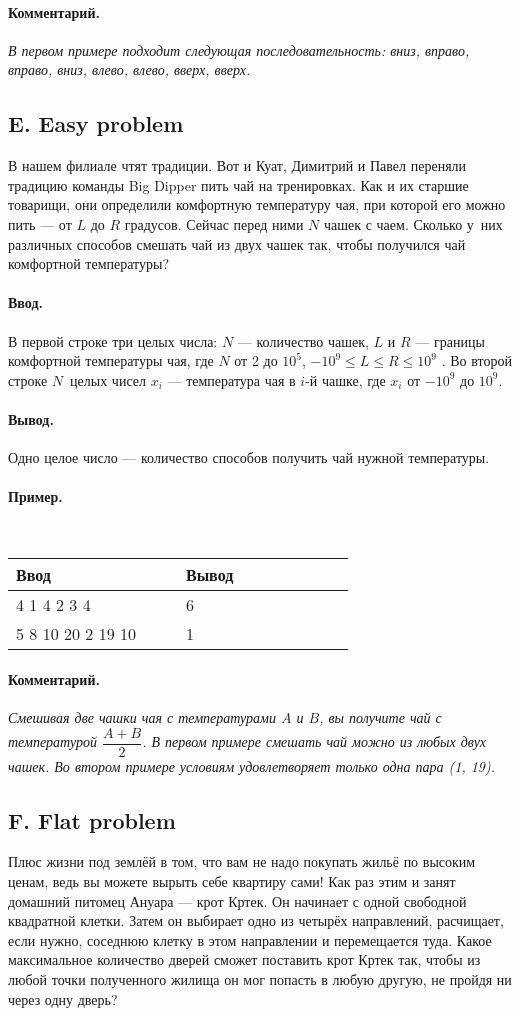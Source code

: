 \documentclass[12pt, a4paper]{article}
\newcommand{\informat}[1]
{
	\paragraph{Ввод.\\} #1
}
\newcommand{\outformat}[1]
{
	\paragraph{Вывод.\\} #1
}
\newcommand{\examplee}[4]
{
	\paragraph{Пример.\\}
	{\tt
	\begin{tabular}{|p{0.4\linewidth}|p{0.4\linewidth}|}
	\hline
	Ввод 	& Вывод  	\\
	\hline
	#1 		& #2 		\\
	\hline
	#3		& #4		\\
	\hline
	\end{tabular}
	}
}
\newcommand{\excomm}[1]
{
	\paragraph{Комментарий. \\}
	\textit{#1}
}
\begin{document}
\excomm{В первом примере подходит следующая последовательность: вниз, впра\-во, впра\-во, вниз, влево, влево, вверх, вверх.}





\subsection*{E. Easy problem}


В нашем филиале чтят традиции. Вот и Куат, Димитрий и Павел переняли традицию команды Big Dipper пить чай на тренировках. Как и их старшие товарищи, они определили комфортную температуру чая, при которой его мож\-но пить --- от $L$ до $R$ градусов. Сейчас перед ними $N$ чашек с чаем. Сколько у~них различных способов смешать чай из двух чашек так, чтобы получился чай комфортной температуры?

\informat{В первой строке три целых числа: $N$ --- количество чашек, $L$ и $R$ --- границы комфортной температуры чая, где $N$ от 2 до $10^5$, $-10^9 \leqslant L \leqslant R \leqslant 10^9$ . \newline
Во второй строке $N$~целых чисел $x_i$ --- температура чая в $i$-й чашке, где $x_i$ от $-10^9$ до $10^9$.}

\outformat{Одно целое число --- количество способов получить чай нужной температуры.}
 
\examplee{
4 1 4 \newline 
1 2 3 4}
{6}
{
5 8 10 \newline
1 20 2 19 10}
{1}

\excomm{Смешивая две чашки чая с температурами $A$ и $B$, вы получите чай с тем\-пе\-ра\-ту\-рой $\dfrac{A+B}{2}$. В первом примере смешать чай можно из любых двух чашек. Во втором примере условиям удовлетворяет только одна пара (1, 19).}
 


\subsection*{F. Flat problem}

 
Плюс жизни под землёй в том, что вам не надо покупать жильё по высоким ценам, ведь вы можете вырыть себе квартиру сами! Как раз этим и занят домашний питомец Ануара --- крот Кртек. Он начинает с одной свободной квадратной клетки. Затем он выбирает одно из четырёх направлений, рас\-чи\-ща\-ет, если нужно, соседнюю клетку в этом направлении и перемещается туда. Какое максимальное количество дверей сможет поставить крот Кртек так, чтобы из любой точки полученного жилища он мог попасть в любую другую, не пройдя ни через одну дверь? 
 
\end{document}
